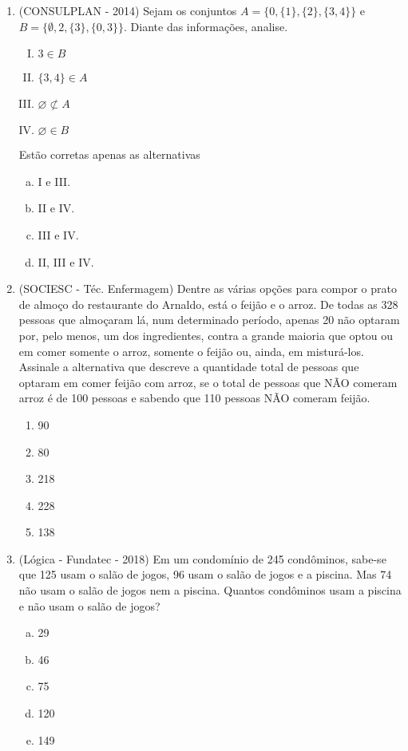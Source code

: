 \begin{enumerate}
 \item (CONSULPLAN - 2014) Sejam os conjuntos $A = \{0, \{1\}, \{2\}, \{3, 4\}\}$ e $B = \{\emptyset, 2, \{3\}, \{0, 3\}\}$. Diante das informações, analise.
 \begin{multicols}{2}
 \begin{enumerate}[I)]
  \item $3 \in B$
  \item $\{3, 4\} \in A$
  \item $\varnothing \nsubset A$
  \item $\varnothing \in B$
 \end{enumerate}
 \end{multicols}
 Estão corretas apenas as alternativas
 \begin{multicols}{2}
 \begin{enumerate}[a)]
 \item I e III.
 \item II e IV.
 \item III e IV.
 \item II, III e IV.
 \end{enumerate}
 \end{multicols}

 \item (SOCIESC - Téc. Enfermagem) Dentre as várias opções para compor o prato de almoço do restaurante do Arnaldo, está o feijão e o arroz. De todas as 328 pessoas que almoçaram lá, num determinado período, apenas 20 não optaram por, pelo menos, um dos ingredientes, contra a grande maioria que optou ou em comer somente o arroz, somente o feijão ou, ainda, em misturá-los. Assinale a alternativa que descreve a quantidade total de pessoas que optaram em comer feijão com arroz, se o total de pessoas que NÃO comeram arroz é de 100 pessoas e sabendo que 110 pessoas NÃO comeram feijão.
  \begin{enumerate}
  \item 90
  \item 80
  \item 218
  \item 228
  \item 138
 \end{enumerate}

 \newpage
 \item (Lógica - Fundatec - 2018) Em um condomínio de 245 condôminos, sabe-se que 125 usam o salão de jogos, 96 usam o salão de jogos e a piscina. Mas 74 não usam o salão de jogos nem a piscina. Quantos condôminos usam a piscina e não usam o salão de jogos?
\begin{multicols}{5}
\begin{enumerate}[a)]
\item 29
\item 46
\item 75
\item 120
\item 149
\end{enumerate}
\end{multicols}


\end{enumerate}
